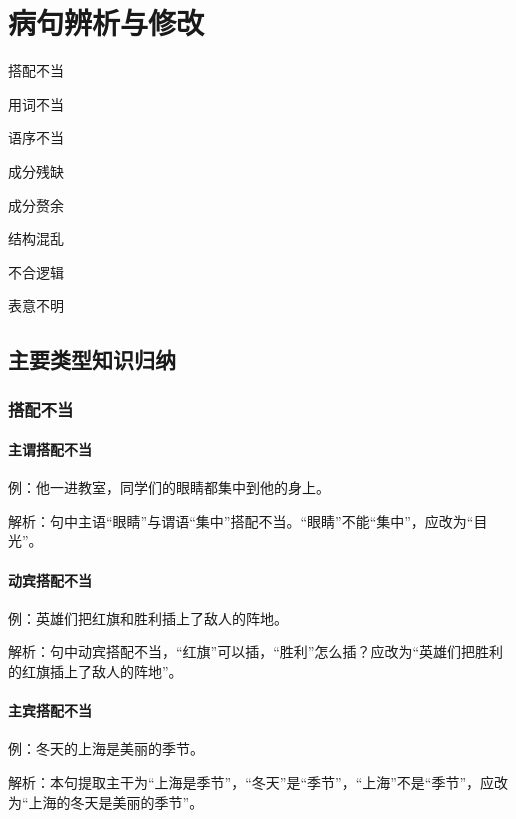 \chapter{病句辨析与修改}

\begin{introduction}
  \item 搭配不当
  \item 用词不当
  \item 语序不当
  \item 成分残缺
  \item 成分赘余
  \item 结构混乱
  \item 不合逻辑
  \item 表意不明
\end{introduction}


\section{主要类型知识归纳}

\subsection{搭配不当}

\subsubsection{主谓搭配不当}

例：他一进教室，同学们的眼睛都集中到他的身上。

解析：句中主语“眼睛”与谓语“集中”搭配不当。“眼睛”不能“集中”，应改为“目光”。

\subsubsection{动宾搭配不当}

例：英雄们把红旗和胜利插上了敌人的阵地。

解析：句中动宾搭配不当，“红旗”可以插，“胜利”怎么插？应改为“英雄们把胜利的红旗插上了敌人的阵地”。

\subsubsection{主宾搭配不当}

例：冬天的上海是美丽的季节。

解析：本句提取主干为“上海是季节”，“冬天”是“季节”，“上海”不是“季节”，应改为“上海的冬天是美丽的季节”。

